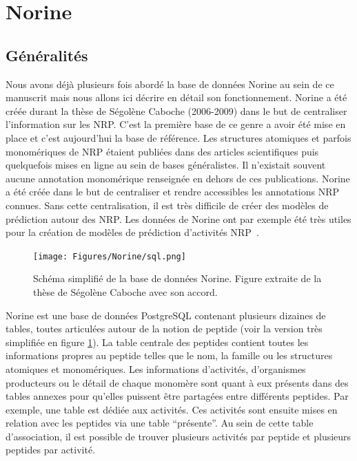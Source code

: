 \section{Norine}
\label{nor_3}

\subsection{Généralités}

Nous avons déjà plusieurs fois abordé la base de données Norine au sein de ce manuscrit mais nous allons ici décrire en détail son fonctionnement.
Norine a été créée durant la thèse de Ségolène Caboche (2006-2009) dans le but de centraliser l'information sur les NRP.
C'est la première base de ce genre a avoir été mise en place et c'est aujourd'hui la base de référence.
Les structures atomiques et parfois monomériques de NRP étaient publiées dans des articles scientifiques puis quelquefois mises en ligne au sein de bases généralistes.
Il n'existait souvent aucune annotation monomérique renseignée en dehors de ces publications.
Norine a été créée dans le but de centraliser et rendre accessibles les annotations NRP connues.
Sans cette centralisation, il est très difficile de créer des modèles de prédiction autour des NRP.
Les données de Norine ont par exemple été très utiles pour la création de modèles de prédiction d'activités NRP~\cite{abdo_prediction_2014,abdo_new_2012}.

\begin{figure}[h!]
  \begin{center}
    \texttt{[image: Figures/Norine/sql.png]}
    \caption{\label{sql}Schéma simplifié de la base de données Norine.
    Figure extraite de la thèse de Ségolène Caboche avec son accord.}
  \end{center}
\end{figure}

Norine est une base de données PostgreSQL contenant plusieurs dizaines de tables, toutes articulées autour de la notion de peptide (voir la version très simplifiée en figure \ref{sql}).
La table centrale des peptides contient toutes les informations propres au peptide telles que le nom, la famille ou les structures atomiques et monomériques.
Les informations d'activités, d'organismes producteurs ou le détail de chaque monomère sont quant à eux présents dans des tables annexes pour qu'elles puissent être partagées entre différents peptides.
Par exemple, une table est dédiée aux activités.
Ces activités sont ensuite mises en relation avec les peptides via une table ``présente''.
Au sein de cette table d'association, il est possible de trouver plusieurs activités par peptide et plusieurs peptides par activité.

